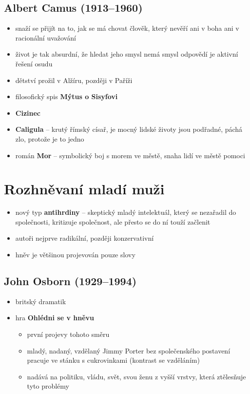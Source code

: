 \subsection{Albert Camus (1913--1960)}
\begin{itemize}
\item snaží se přijít na to, jak se má chovat člověk, který nevěří ani v boha ani v racionální uvažování
\item život je tak absurdní, že hledat jeho smysl nemá smysl \ra odpovědí je aktivní řešení osudu
\item dětství prožil v Alžíru, později v Paříži
\item filosofický spis \textbf{Mýtus o Sisyfovi}
\item \textbf{Cizinec}
\item \textbf{Caligula} -- krutý římský císař, je mocný \ra lidské životy jsou podřadné, páchá zlo, protože je to jedno
\item román \textbf{Mor} -- symbolický boj s morem ve městě, snaha lidí ve městě pomoci
\end{itemize}



\section{Rozhněvaní mladí muži}
\begin{itemize}
\item nový typ \textbf{antihrdiny} -- skeptický mladý intelektuál, který se nezařadil do společnosti, kritizuje společnost, ale přesto se do ní touží začlenit
\item autoři nejprve radikální, později konzervativní
\item hněv je většinou projevován pouze slovy
\end{itemize}

\subsection{John Osborn (1929--1994)}
\begin{itemize}
\item britský dramatik
\item hra \textbf{Ohlédni se v hněvu}
	\begin{itemize}
	\item první projevy tohoto směru
	\item mladý, nadaný, vzdělaný Jimmy Porter  bez společenského postavení pracuje ve stánku s cukrovinkami (kontrast se vzděláním)
	\item nadává na politiku, vládu, svět, svou ženu z vyšší vrstvy, která ztělesňuje tyto problémy
	\end{itemize}
\end{itemize}

